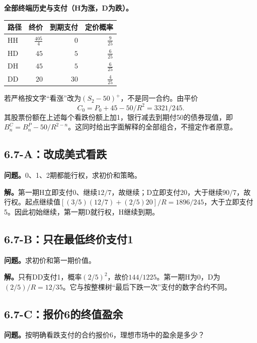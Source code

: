 \documentclass[11pt,a4paper,UTF8,fontset=fandol]{ctexart}
\begin{document}
\textbf{全部终端历史与支付（H为涨，D为跌）。}

\begin{longtable}[]{@{}lrrr@{}}
\toprule\noalign{}
路径 & 终价 & 到期支付 & 定价概率 \\
\midrule\noalign{}
\endhead
\bottomrule\noalign{}
\endlastfoot
HH & \(\frac{405}{4}\) & \(0\) & \(\frac{9}{25}\) \\
HD & \(45\) & \(5\) & \(\frac{6}{25}\) \\
DH & \(45\) & \(5\) & \(\frac{6}{25}\) \\
DD & \(20\) & \(30\) & \(\frac{4}{25}\) \\
\end{longtable}

\endgroup

若严格按文字``看涨''改为\((S_2-50)^+\)，不是同一合约。由平价
\[\boxed{C_0=P_0+45-50/R^2=3321/245.}\]
其股票份额在上述每个看跌份额上加1，银行减去到期付50的债券现值，即\(B_n^{C}=B_n^P-50/R^{2-n}\)。这同时给出字面解释的全部组合，不擅定作者原意。

\subsection{6.7-A：改成美式看跌}\label{aux6539ux6210ux7f8eux5f0fux770bux8dcc}

\textbf{问题。}0、1、2期都能行权，求初价和策略。

\textbf{解。}第一期H立即支付0、继续\(12/7\)，故继续；D立即支付20，大于继续\(90/7\)，故行权。起点继续值\([(3/5)(12/7)+(2/5)20]/R=\boxed{1896/245}\)，大于立即支付5。因此初始继续，第一期D就行权，H继续到期。

\subsection{6.7-B：只在最低终价支付1}\label{bux53eaux5728ux6700ux4f4eux7ec8ux4ef7ux652fux4ed81}

\textbf{问题。}求初价和第一期价值。

\textbf{解。}只有DD支付1，概率\((2/5)^2\)，故价\(\boxed{144/1225}\)。第一期H为0，D为\((2/5)/R=12/35\)。它与按整棵树``最后下跌一次''支付的数字合约不同。

\subsection{6.7-C：报价6的终值盈余}\label{cux62a5ux4ef76ux7684ux7ec8ux503cux76c8ux4f59}

\textbf{问题。}按明确看跌支付的合约报价6，理想市场中的盈余是多少？
\end{document}
